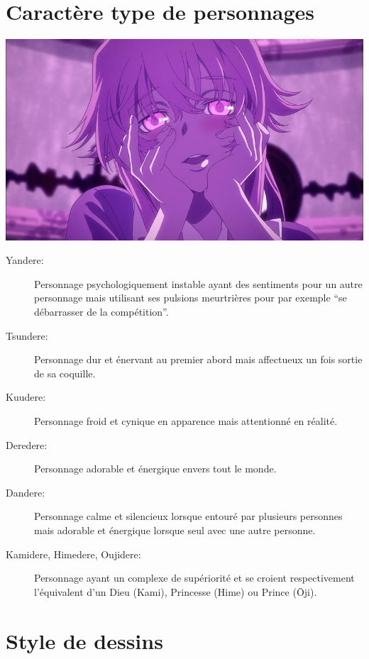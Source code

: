 \section{Caractère type de personnages}

\begin{center}
	\includegraphics[scale=0.5]{Yandere.jpg}
\end{center}

\begin{description}
	\item[Yandere:] Personnage psychologiquement instable ayant des
		sentiments pour un autre personnage mais utilisant ses pulsions
		meurtrières pour par exemple ``se débarrasser de la compétition''.
	\item[Tsundere:] Personnage dur et énervant au premier abord mais
		affectueux un fois sortie de sa coquille.
	\item[Kuudere:] Personnage froid et cynique en apparence mais attentionné
		en réalité.
	\item[Deredere:] Personnage adorable et énergique envers tout le monde.
	\item[Dandere:] Personnage calme et silencieux lorsque entouré par
		plusieurs personnes mais adorable et énergique lorsque seul avec une
		autre personne.
	\item[Kamidere, Himedere, Oujidere:] Personnage ayant un complexe
		de supériorité et se croient respectivement l'équivalent d'un
		Dieu (Kami), Princesse (Hime) ou Prince (\=Oji).
\end{description}

\section{Style de dessins}

